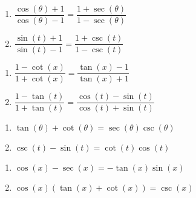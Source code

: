 \begin{multicols}{2}

\begin{enumerate}

\setcounter{enumi}{\value{HW}}

\item $\dfrac{\cos(\theta) + 1}{\cos(\theta) - 1} = \dfrac{1 + \sec(\theta)}{1 - \sec(\theta)}$
\item $\dfrac{\sin(t) + 1}{\sin(t) - 1} = \dfrac{1 + \csc(t)}{1 - \csc(t)}$

\setcounter{HW}{\value{enumi}}

\end{enumerate}

\end{multicols}

\begin{multicols}{2}

\begin{enumerate}

\setcounter{enumi}{\value{HW}}

\item $\dfrac{1 - \cot(x)}{1+ \cot(x)} = \dfrac{\tan(x) - 1}{\tan(x) + 1}$
\item $\dfrac{1 - \tan(t)}{1+ \tan(t)} = \dfrac{\cos(t) - \sin(t)}{\cos(t) + \sin(t)}$

\setcounter{HW}{\value{enumi}}

\end{enumerate}

\end{multicols}

\begin{multicols}{2}

\begin{enumerate}

\setcounter{enumi}{\value{HW}}

\item $\tan(\theta) + \cot(\theta) = \sec(\theta)\csc(\theta)$
\item $\csc(t) - \sin(t) = \cot(t)\cos(t)$

\setcounter{HW}{\value{enumi}}

\end{enumerate}

\end{multicols}

\begin{multicols}{2}

\begin{enumerate}

\setcounter{enumi}{\value{HW}}

\item $\cos(x) - \sec(x) = -\tan(x)\sin(x)$
\item $\cos(x)(\tan(x) + \cot(x)) = \csc(x)$

\setcounter{HW}{\value{enumi}}

\end{enumerate}

\end{multicols}

